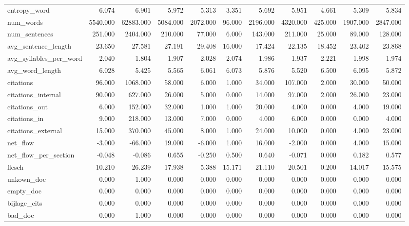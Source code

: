 \begin{tabular}{lrrrrrrrrrr}
\cline{1-11}
entropy\_word & 6.074 & 6.901 & 5.972 & 5.313 & 3.351 & 5.692 & 5.951 & 4.661 & 5.309 & 5.834 \\
\cline{1-11}
num\_words & 5540.000 & 62883.000 & 5084.000 & 2072.000 & 96.000 & 2196.000 & 4320.000 & 425.000 & 1907.000 & 2847.000 \\
\cline{1-11}
num\_sentences & 251.000 & 2404.000 & 210.000 & 77.000 & 6.000 & 143.000 & 211.000 & 25.000 & 89.000 & 128.000 \\
\cline{1-11}
avg\_sentence\_length & 23.650 & 27.581 & 27.191 & 29.408 & 16.000 & 17.424 & 22.135 & 18.452 & 23.402 & 23.868 \\
\cline{1-11}
avg\_syllables\_per\_word & 2.040 & 1.804 & 1.907 & 2.028 & 2.074 & 1.986 & 1.937 & 2.221 & 1.998 & 1.974 \\
\cline{1-11}
avg\_word\_length & 6.028 & 5.425 & 5.565 & 6.061 & 6.073 & 5.876 & 5.520 & 6.500 & 6.095 & 5.872 \\
\cline{1-11}
citations & 96.000 & 1068.000 & 58.000 & 6.000 & 1.000 & 34.000 & 107.000 & 2.000 & 30.000 & 50.000 \\
\cline{1-11}
citations\_internal & 90.000 & 627.000 & 26.000 & 5.000 & 0.000 & 14.000 & 97.000 & 2.000 & 26.000 & 23.000 \\
\cline{1-11}
citations\_out & 6.000 & 152.000 & 32.000 & 1.000 & 1.000 & 20.000 & 4.000 & 0.000 & 4.000 & 19.000 \\
\cline{1-11}
citations\_in & 9.000 & 218.000 & 13.000 & 7.000 & 0.000 & 4.000 & 6.000 & 0.000 & 0.000 & 4.000 \\
\cline{1-11}
citations\_external & 15.000 & 370.000 & 45.000 & 8.000 & 1.000 & 24.000 & 10.000 & 0.000 & 4.000 & 23.000 \\
\cline{1-11}
net\_flow & -3.000 & -66.000 & 19.000 & -6.000 & 1.000 & 16.000 & -2.000 & 0.000 & 4.000 & 15.000 \\
\cline{1-11}
net\_flow\_per\_section & -0.048 & -0.086 & 0.655 & -0.250 & 0.500 & 0.640 & -0.071 & 0.000 & 0.182 & 0.577 \\
\cline{1-11}
flesch & 10.210 & 26.239 & 17.938 & 5.388 & 15.171 & 21.110 & 20.501 & 0.200 & 14.017 & 15.575 \\
\cline{1-11}
unkown\_doc & 0.000 & 1.000 & 0.000 & 0.000 & 0.000 & 0.000 & 0.000 & 0.000 & 0.000 & 0.000 \\
\cline{1-11}
empty\_doc & 0.000 & 0.000 & 0.000 & 0.000 & 0.000 & 0.000 & 0.000 & 0.000 & 0.000 & 0.000 \\
\cline{1-11}
bijlage\_cits & 0.000 & 0.000 & 0.000 & 0.000 & 0.000 & 0.000 & 0.000 & 0.000 & 0.000 & 0.000 \\
\cline{1-11}
bad\_doc & 0.000 & 1.000 & 0.000 & 0.000 & 0.000 & 0.000 & 0.000 & 0.000 & 0.000 & 0.000 \\
\cline{1-11}
\bottomrule
\end{tabular}
